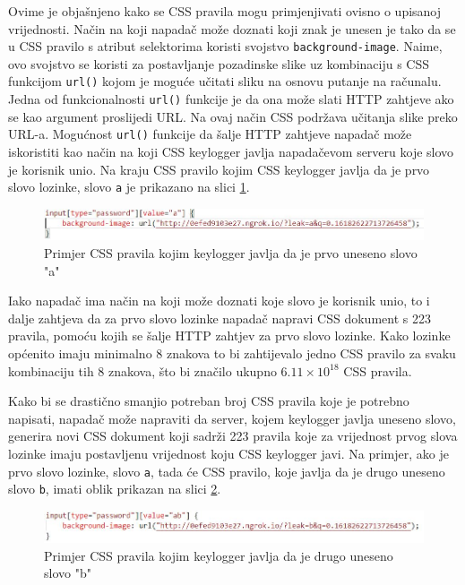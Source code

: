 \documentclass[12pt, oneside, onecolumn]{book}
\begin{document}
{\pagebreak

Ovime je objašnjeno kako se CSS pravila mogu primjenjivati ovisno o upisanoj vrijednosti. Način na koji napadač može doznati koji znak je unesen je tako da se u CSS pravilo s atribut selektorima koristi svojstvo \texttt{background-image}. Naime, ovo svojstvo se koristi za postavljanje pozadinske slike uz kombinaciju s CSS funkcijom \texttt{url()} kojom je moguće učitati sliku na osnovu putanje na računalu. Jedna od funkcionalnosti \texttt{url()} funkcije je da ona može slati HTTP zahtjeve ako se kao argument proslijedi URL. Na ovaj način CSS podržava učitanja slike preko URL-a. Mogućnost \texttt{url()} funkcije da šalje HTTP zahtjeve napadač može iskoristiti kao način na koji CSS keylogger javlja napadačevom serveru koje slovo je korisnik unio. Na kraju CSS pravilo kojim CSS keylogger javlja da je prvo slovo lozinke, slovo \texttt{a} je prikazano na slici \ref{fig:css_rule}.

\begin{figure}[H]
	\begin{center}
		\includegraphics[width=\textwidth]{css_rule.jpg}
		\caption{Primjer CSS pravila kojim keylogger javlja da je prvo uneseno slovo "a"} \label{fig:css_rule}
	\end{center}
\end{figure}

Iako napadač ima način na koji može doznati koje slovo je korisnik unio, to i dalje zahtjeva da za prvo slovo lozinke napadač napravi CSS dokument s 223 pravila, pomoću kojih se šalje HTTP zahtjev za prvo slovo lozinke. Kako lozinke općenito imaju minimalno 8 znakova to bi zahtijevalo jedno CSS pravilo za svaku kombinaciju tih 8 znakova, što bi značilo ukupno \(6.11 \times 10^{18}\) CSS pravila.

Kako bi se drastično smanjio potreban broj CSS pravila koje je potrebno napisati, napadač može napraviti da server, kojem keylogger javlja uneseno slovo, generira novi CSS dokument koji sadrži 223 pravila koje za vrijednost prvog slova lozinke imaju postavljenu vrijednost koju CSS keylogger javi. Na primjer, ako je prvo slovo lozinke, slovo \texttt{a}, tada će CSS pravilo, koje javlja da je drugo uneseno slovo \texttt{b}, imati oblik prikazan na slici \ref{fig:css_sl}.

\begin{figure}[H]
	\begin{center}
		\includegraphics[width=\textwidth]{css_sl.jpg}
		\caption{Primjer CSS pravila kojim keylogger javlja da je drugo uneseno slovo "b"} \label{fig:css_sl}
	\end{center}
\end{figure}

}
\end{document}
